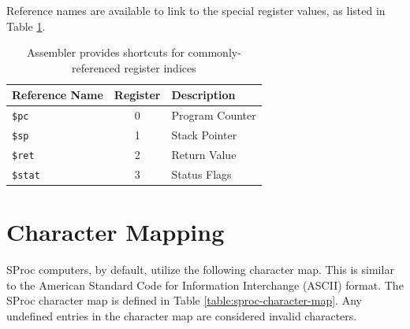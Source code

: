 \documentclass{article}
\begin{document}
Reference names are available to link to the special register values, as listed in Table \ref{table:assembler-register-references}.

\begin{table}[h!]
	\centering
	\begin{tabular}{l|cl}
		\hline
		Reference Name & Register & Description \\
		\hline
		\texttt{\$pc} & 0 & Program Counter \\
		\texttt{\$sp} & 1 & Stack Pointer \\
		\texttt{\$ret} & 2 & Return Value \\
		\texttt{\$stat} & 3 & Status Flags \\
		\hline
	\end{tabular}
	\caption{Assembler provides shortcuts for commonly-referenced register indices}
	\label{table:assembler-register-references}
\end{table}

\pagebreak

\section{Character Mapping}
\label{sec:character-map}

SProc computers, by default, utilize the following character map. This is similar to the American Standard Code for Information Interchange (ASCII) format. The SProc character map is defined in Table \ref{table:sproc-character-map}. Any undefined entries in the character map are considered invalid characters.

\newcommand{\charmap}[1]{\texttt{#1}}

\newcommand{\charslash}{\texttt{\char`\\}}

\newcommand{\charmapescape}[1]{\charmap{\texttt{\charslash#1}}}
\end{document}
